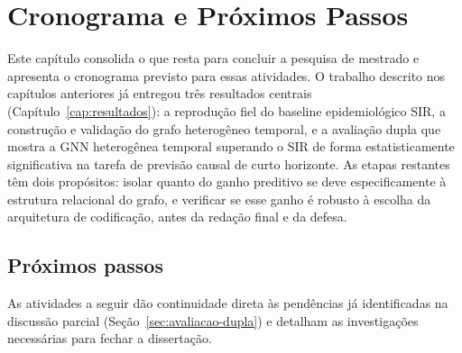 \chapter{Cronograma e Próximos Passos}
\label{cap:cronograma}

Este capítulo consolida o que resta para concluir a pesquisa de mestrado e apresenta o cronograma previsto para essas atividades. O trabalho descrito nos capítulos anteriores já entregou três resultados centrais (Capítulo~\ref{cap:resultados}): a reprodução fiel do baseline epidemiológico SIR, a construção e validação do grafo heterogêneo temporal, e a avaliação dupla que mostra a GNN heterogênea temporal superando o SIR de forma estatisticamente significativa na tarefa de previsão causal de curto horizonte. As etapas restantes têm dois propósitos: isolar quanto do ganho preditivo se deve especificamente à estrutura relacional do grafo, e verificar se esse ganho é robusto à escolha da arquitetura de codificação, antes da redação final e da defesa.


\section{Próximos passos}

As atividades a seguir dão continuidade direta às pendências já identificadas na discussão parcial (Seção~\ref{sec:avaliacao-dupla}) e detalham as investigações necessárias para fechar a dissertação.

